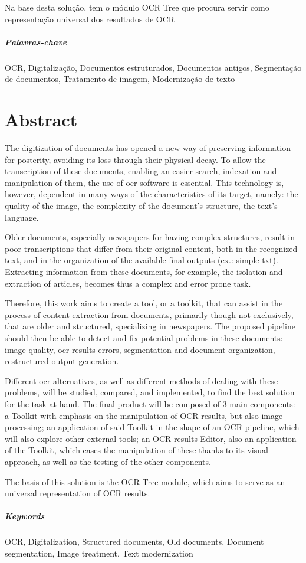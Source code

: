 Na base desta solução, tem o módulo OCR Tree que procura servir como representação universal dos resultados de OCR


\paragraph{Palavras-chave} OCR, Digitalização, Documentos estruturados, Documentos antigos, Segmentação de documentos, Tratamento de imagem, Modernização de texto

\cleardoublepage

\chapter*{Abstract}

The digitization of documents has opened a new way of preserving information for posterity, avoiding its loss through their physical decay. To allow the transcription of these documents, enabling an easier search, indexation and manipulation of them, the use of \acrshort{ocr} software is essential. This technology is, however, dependent in many ways of the characteristics of its target, namely: the quality of the image, the complexity of the document's structure, the text's language. 

Older documents, especially newspapers for having complex structures, result in poor transcriptions that differ from their original content, both in the recognized text, and in the organization of the available final outputs (ex.: simple txt).
Extracting information from these documents, for example, the isolation and extraction of articles, becomes thus a complex and error prone task. 

Therefore, this work aims to create a tool, or a toolkit, that can assist in the process of content extraction from documents, primarily though not exclusively, that are older and structured, specializing in newspapers. The proposed pipeline should then be able to detect and fix potential problems in these documents: image quality, \acrshort{ocr} results errors, segmentation and document organization, restructured output generation.

Different \acrshort{ocr} alternatives, as well as different methods of dealing with these problems, will be studied, compared, and implemented, to find the best solution for the task at hand. The final product will be composed of 3 main components: a Toolkit with emphasis on the manipulation of OCR results, but also image processing; an application of said Toolkit in the shape of an OCR pipeline, which will also explore other external tools; an OCR results Editor, also an application of the Toolkit, which eases the manipulation of these thanks to its visual approach, as well as the testing of the other components.

The basis of this solution is the OCR Tree module, which aims to serve as an universal representation of OCR results.


\paragraph{Keywords} OCR, Digitalization, Structured documents, Old documents, Document segmentation, Image treatment, Text modernization

\cleardoublepage
